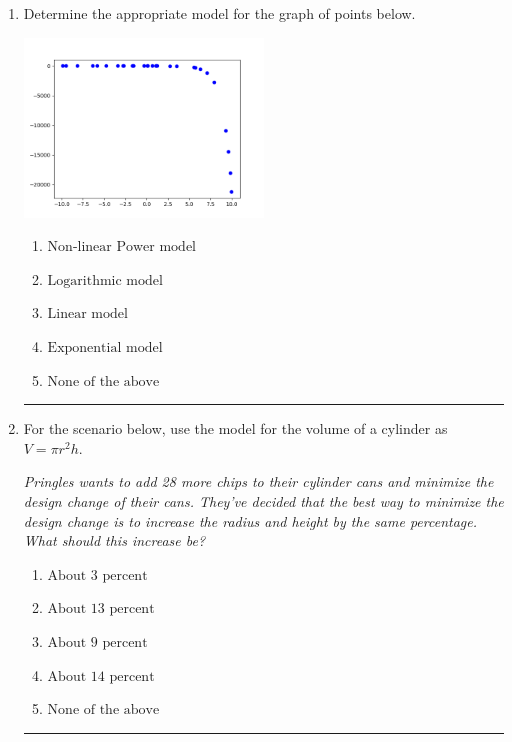 \documentclass[14pt]{extbook}
\newcommand{\litem}[1]{\item#1\hspace*{-1cm}\rule{\textwidth}{0.4pt}}
\begin{document}
\begin{enumerate}
\litem{
Determine the appropriate model for the graph of points below.
\begin{center}
    \includegraphics[width=0.5\textwidth]{../Figures/identifyModelGraph12C.png}
\end{center}
\begin{enumerate}[label=\Alph*.]
\item \( \text{Non-linear Power model} \)
\item \( \text{Logarithmic model} \)
\item \( \text{Linear model} \)
\item \( \text{Exponential model} \)
\item \( \text{None of the above} \)

\end{enumerate} }
\litem{
For the scenario below, use the model for the volume of a cylinder as $V = \pi r^2 h$.
\begin{center}
    \textit{ Pringles wants to add 28 \text{percent} more chips to their cylinder cans and minimize the design change of their cans. They've decided that the best way to minimize the design change is to increase the radius and height by the same percentage. What should this increase be? }
\end{center}
\begin{enumerate}[label=\Alph*.]
\item \( \text{About } 3 \text{ percent} \)
\item \( \text{About } 13 \text{ percent} \)
\item \( \text{About } 9 \text{ percent} \)
\item \( \text{About } 14 \text{ percent} \)
\item \( \text{None of the above} \)


\end{enumerate}}
\end{enumerate}
\end{document}
